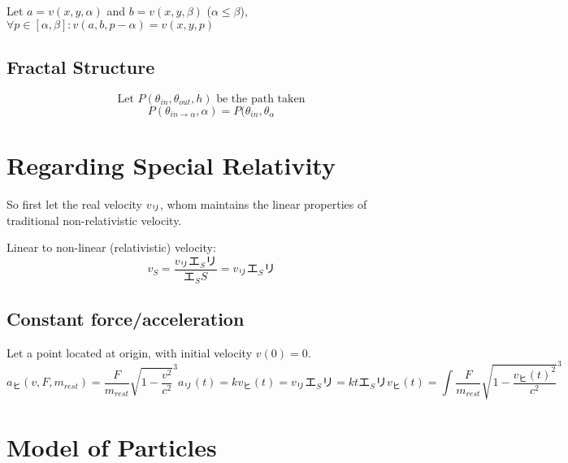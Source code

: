 \documentclass[preprint]{ptephy_v1}%
\newcommand{\jp}[1]{#1}
\newcommand{\jp}[1]{\text{#1}}
\begin{document}
Let $a=v(x, y, \alpha)$ and $b=v(x, y, \beta)$ ($\alpha\leq\beta$), $\forall p\in[\alpha, \beta]: v(a, b, p-\alpha)=v(x, y, p)$

\subsection{Fractal Structure}
\begin{equation}
    \text{Let }P(\theta_{in}, \theta_{out}, h)\text{ be the path taken}
\end{equation}
\begin{equation}
    P(\theta_{in\to\alpha}, \alpha)=P(\theta_{in}, \theta_{\alpha}
\end{equation}


\newpage
\section{Regarding Special Relativity}
So first let the real velocity \(v_リ\), whom maintains the linear properties of traditional non-relativistic velocity.


Linear to non-linear (relativistic) velocity:
\begin{equation}
    v_S=\frac{v_\jp{リ}\jp{エ}_S\jp{リ}}{\jp{エ}_SS}=v_\jp{リ}\jp{エ}_S\jp{リ}
\end{equation}

\subsection{Constant force/acceleration}
Let a point located at origin, with initial velocity $v(0)=0$.
\begin{subequations}
    \begin{equation}
        a_\jp{ヒ}(v, F, m_{rest})=\frac{F}{m_{rest}}\sqrt{1-\frac{v^2}{c^2}}^3
    \end{equation}
    \begin{equation}
        a_\jp{リ}(t)=k
    \end{equation}
    \begin{equation}
        v_\jp{ヒ}(t)=v_\jp{リ}\jp{エ}_S\jp{リ}=kt\jp{エ}_S\jp{リ}
    \end{equation}
    \begin{equation}
        v_\jp{ヒ}(t)=\int \frac{F}{m_{rest}}\sqrt{1-\frac{v_\jp{ヒ}(t)^2}{c^2}}^3
    \end{equation}
\end{subequations}


\section{Model of Particles}
\end{document}
